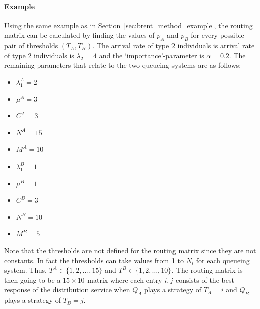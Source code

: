 \paragraph{Example}\label{sec:routing_matrix_example}
Using the same example as in Section~\ref{sec:brent_method_example}, the routing
matrix can be calculated by finding the values of \(p_A\) and \(p_B\) for every
possible pair of thresholds \((T_A, T_B)\).
The arrival rate of type 2 individuals is arrival rate of type 2 individuals is
\(\lambda_2 = 4\) and the `importance'-parameter is \(\alpha = 0.2\).
The remaining parameters that relate to the two queueing systems are as follows:

\begin{multicols}{2}
    \begin{itemize}
        \item \(\lambda_1^A = 2\)
        \item \(\mu^A = 3\)
        \item \(C^A = 3\)
        \item \(N^A = 15\)
        \item \(M^A = 10\)
        \item \(\lambda_1^B = 1\)
        \item \(\mu^B = 1\)
        \item \(C^B = 3\)
        \item \(N^B = 10\)
        \item \(M^B = 5\)
    \end{itemize}
\end{multicols}

Note that the thresholds are not defined for the routing matrix since they are
not constants.
In fact the thresholds can take values from 1 to \(N_i\) for each queueing
system.
Thus, \(T^A \in \{1, 2, \dots, 15\}\) and \(T^B \in \{1, 2, \dots, 10\}\).
The routing matrix is then going to be a \(15 \times 10\) matrix where each
entry \(i, j\) consists of the best response of the distribution service when
\(Q_A\) plays a strategy of \(T_A=i\) and \(Q_B\) plays a strategy of \(T_B=j\).


